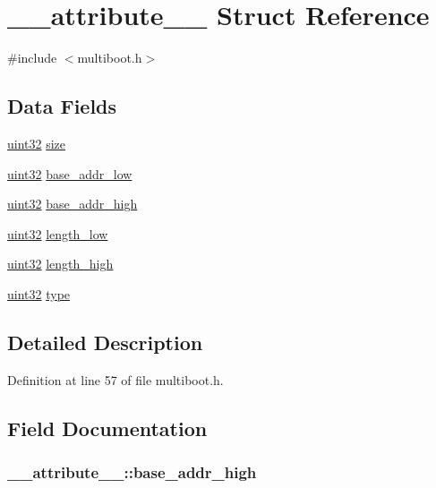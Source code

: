 \hypertarget{struct____attribute____}{
\section{\_\-\_\-attribute\_\-\_\- Struct Reference}
\label{struct____attribute____}
}


{\ttfamily \#include $<$multiboot.h$>$}

\subsection*{Data Fields}
\begin{DoxyCompactItemize}
\item 
\hyperlink{int__types_8h_a1134b580f8da4de94ca6b1de4d37975e}{uint32} \hyperlink{struct____attribute_____adfda3ad54fd32b7b9d4386d915d5cfc0}{size}
\item 
\hyperlink{int__types_8h_a1134b580f8da4de94ca6b1de4d37975e}{uint32} \hyperlink{struct____attribute_____af3f9006aed492760c1dad84ea4298a7a}{base\_\-addr\_\-low}
\item 
\hyperlink{int__types_8h_a1134b580f8da4de94ca6b1de4d37975e}{uint32} \hyperlink{struct____attribute_____a41388276c495507b2ac3b7f12f569983}{base\_\-addr\_\-high}
\item 
\hyperlink{int__types_8h_a1134b580f8da4de94ca6b1de4d37975e}{uint32} \hyperlink{struct____attribute_____a7f0d4ed5675df39d8861574e0a3e239e}{length\_\-low}
\item 
\hyperlink{int__types_8h_a1134b580f8da4de94ca6b1de4d37975e}{uint32} \hyperlink{struct____attribute_____a9811ef454074c38ef0488c8c81ec9556}{length\_\-high}
\item 
\hyperlink{int__types_8h_a1134b580f8da4de94ca6b1de4d37975e}{uint32} \hyperlink{struct____attribute_____a467e2efa5015d708e12bfe5166936e89}{type}
\end{DoxyCompactItemize}


\subsection{Detailed Description}


Definition at line 57 of file multiboot.h.



\subsection{Field Documentation}
\hypertarget{struct____attribute_____a41388276c495507b2ac3b7f12f569983}{
\subsubsection[{base\_\-addr\_\-high}]{ {\bf \_\-\_\-attribute\_\-\_\-::base\_\-addr\_\-high}}}
\label{struct____attribute_____a41388276c495507b2ac3b7f12f569983}


